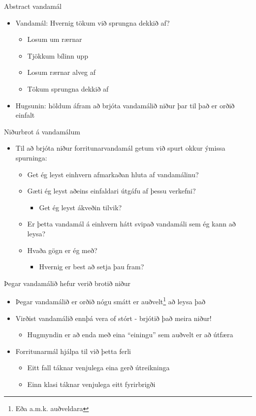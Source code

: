 \documentclass{beamer}
\begin{document}
\begin{frame}{Abstract vandamál}
\begin{itemize}
 \item Vandamál: Hvernig tökum við sprungna dekkið af? \pause
 \begin{itemize}
  \item Losum um rærnar
  \item Tjökkum bílinn upp
  \item Losum rærnar alveg af
  \item Tökum sprungna dekkið af
 \end{itemize}
 \item Hugsunin: höldum áfram að brjóta vandamálið niður þar til það er orðið einfalt
\end{itemize}
\end{frame}

\begin{frame}{Niðurbrot á vandamálum}
\begin{itemize}
 \item Til að brjóta niður forritunarvandamál getum við spurt okkur ýmissa spurninga:
 \begin{itemize}
  \item Get ég leyst einhvern afmarkaðan hluta af vandamálinu?
  \item Gæti ég leyst aðeins einfaldari útgáfu af þessu verkefni?
  \begin{itemize}
   \item Get ég leyst ákveðin tilvik?
  \end{itemize}
  \item Er þetta vandamál á einhvern hátt svipað vandamáli sem ég kann að leysa?
  \item Hvaða gögn er ég með?
  \begin{itemize}
   \item Hvernig er best að setja þau fram?
  \end{itemize}
 \end{itemize}
\end{itemize}
\end{frame}

\begin{frame}{Þegar vandamálið hefur verið brotið niður}
\begin{itemize}
 \item Þegar vandamálið er orðið nógu smátt er auðvelt\footnote{Eða a.m.k. auðveldara} að leysa það
 \item Virðist vandamálið ennþá vera of stórt - brjótið það meira niður!
 \begin{itemize}
  \item Hugmyndin er að enda með eina ``einingu'' sem auðvelt er að útfæra
 \end{itemize}
 \item Forritunarmál hjálpa til við þetta ferli
 \begin{itemize}
  \item Eitt fall táknar venjulega eina gerð útreikninga
  \item Einn klasi táknar venjulega eitt fyrirbrigði
 \end{itemize}
\end{itemize}
\end{frame}
\end{document}
